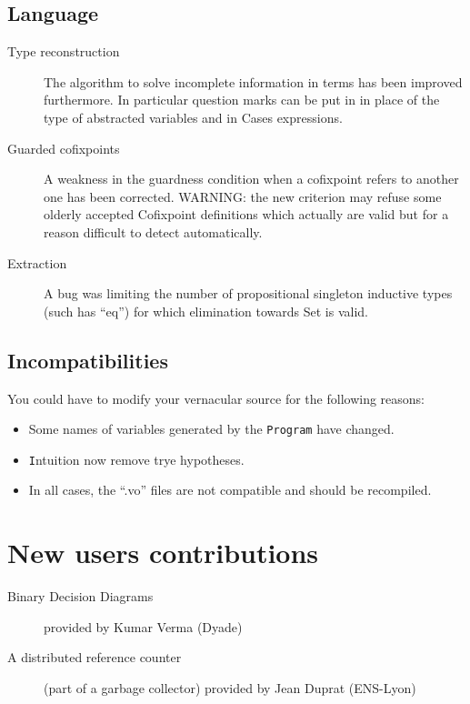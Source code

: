 \documentclass[11pt]{article}
\begin{document}
\subsection{Language}

  \begin{description} \item[Type reconstruction] The algorithm to
  solve incomplete information in terms has been improved
  furthermore. In particular question marks can be put in in place of
  the type of abstracted variables and in Cases expressions.

  \item[Guarded cofixpoints] A weakness in the guardness condition
  when a cofixpoint refers to another one has been corrected.
  WARNING: the new criterion may refuse some olderly accepted
  Cofixpoint definitions which actually are valid but for a reason
  difficult to detect automatically.

  \item[Extraction] A bug was limiting the number of propositional
  singleton inductive types (such has ``eq'') for which elimination
  towards Set is valid.

  \end{description}

\subsection{Incompatibilities}

  You could have to modify your vernacular source for the following
  reasons:

  \begin{itemize}
 
  \item Some names of variables generated by the \texttt{Program} have
   changed.

  \item {\texttt Intuition} now remove trye hypotheses.

  \item In all cases, the ``.vo'' files are not compatible and should
  be recompiled.

  \end{itemize}

\section{New users contributions}

  \begin{description}

  \item[Binary Decision Diagrams] provided by Kumar Verma (Dyade)

  \item[A distributed reference counter] (part of a
  garbage collector) provided by Jean Duprat (ENS-Lyon)

\end{description}
\end{document}
